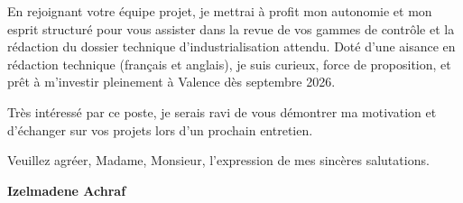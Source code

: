 \documentclass[10pt,a4paper]{altacv}
\begin{document}
\vspace{0.4cm}

En rejoignant votre équipe projet, je mettrai à profit mon autonomie et mon esprit structuré pour vous assister dans la revue de vos gammes de contrôle et la rédaction du dossier technique d'industrialisation attendu. Doté d'une aisance en rédaction technique (français et anglais), je suis curieux, force de proposition, et prêt à m'investir pleinement à Valence dès septembre 2026.

\vspace{0.4cm}

Très intéressé par ce poste, je serais ravi de vous démontrer ma motivation et d'échanger sur vos projets lors d'un prochain entretien.

\vspace{0.5cm}

Veuillez agréer, Madame, Monsieur, l'expression de mes sincères salutations.

\vfill

\begin{flushright}
  \Large\color{emphasis}\textbf{Izelmadene Achraf}
\end{flushright}
\end{document}
